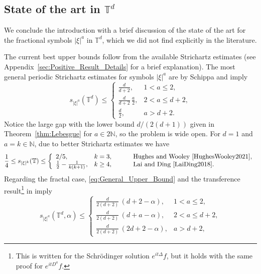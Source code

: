 \documentclass[11pt,reqno]{amsart}
\theoremstyle{definition}
\numberwithin{equation}{section}
\theoremstyle{remark}
\begin{document}
\subsection{State of the art in $\mathbb T^d$}\label{sec:StateOfTheArt}
We conclude the introduction with a brief discussion of the state of the art for the fractional symbols $|\xi|^a$ in $\mathbb T^d$, 
which we did not find explicitly in the literature.


The current best upper bounds follow from the available Strichartz estimates (see Appendix~\ref{sec:Positive_Result_Details} for a brief explanation).
The most general periodic Strichartz estimates for symbols $|\xi|^a$ are by Schippa \cite{Schippa2020} and imply
\begin{equation}\label{eq:General_Upper_Bound}
    s_{|\xi|^a}(\mathbb T^d)
    \leq 
    \left\{
    \begin{array}{ll}
       \frac{d}{d+2},   & 1 < a \leq 2, \\
       \frac{d}{d+2}\, \frac{a}{2},   & 2 < a \leq d+2, \\
       \frac{d}{2},     & a > d+2.
    \end{array}
    \right.    
\end{equation}
Notice the large gap with the lower bound $d/(2(d+1))$ given in Theorem~\ref{thm:Lebesgue} for $a \in 2\mathbb N$,
so the problem is wide open. 
For $d=1$ and $a = k \in \mathbb N$,
due to better Strichartz estimates we have
\begin{equation}
    \frac14 
    \leq 
    s_{|\xi|^k}(\mathbb T)
    \leq 
    \left\{
    \begin{array}{lllll}
       2/5,   & k = 3,  & & & \text{ Hughes and Wooley \cite{HughesWooley2021}},  \\
       \frac{1}{2} - \frac{1}{k(k+1)}, & k \geq 4, & & & \text{ Lai and Ding \cite{LaiDing2018}}.
    \end{array}
    \right.    
\end{equation}
Regarding the fractal case, \eqref{eq:General_Upper_Bound} and the transference result\footnote{This is written for the Schr\"odinger solution $e^{it\Delta}f$, but it holds with the same proof for $e^{itD^a}f$.} in \cite[Prop. 5.2]{EceizabarrenaLuca2022} imply
\begin{equation}\label{eq:General_Upper_Bound_Fractal}
    s_{|\xi|^a}(\mathbb T^d,\alpha)
    \leq 
    \left\{
    \begin{array}{ll}
       \frac{d}{2(d+2)}\, (d+2-\alpha),   & 1 < a \leq 2, \\
       \frac{d}{2(d+2)}\, (d+a-\alpha),   & 2 < a \leq d+2, \\
       \frac{d}{2(d+2)}\, (2d+2-\alpha),     & a > d+2,
    \end{array}
    \right. 
\end{equation}
\end{document}
